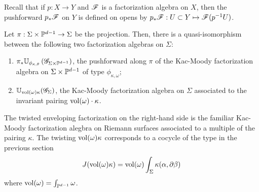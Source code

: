 Recall that if $p : X \to Y$ and $\mathscr F$ is a factorization algebra on $X$, then the pushforward $p_* \mathscr F$ on $Y$ is defined on opens by $p_* \mathscr F : U \subset Y \mapsto \mathscr F(p^{-1} U)$. 

\begin{prop}
Let $\pi : \Sigma \times \mathbb P^{d-1} \to \Sigma$ be the projection. 
Then, there is a quasi-isomorphism between the following two factorization algebras on $\Sigma$:
\begin{enumerate}
\item $\pi_* \mathbb U_{\phi_{\kappa, \theta}} \left(\mathscr G_{\Sigma \times \mathbb P^{d-1}}\right)$, the pushforward along $\pi$ of the Kac-Moody factorization algebra on $\Sigma \times \mathbb P^{d-1}$ of type $\phi_{\kappa,\omega}$;
\item $\mathbb U_{{\rm vol}(\omega) \kappa} (\mathscr G_\Sigma)$, the Kac-Moody factorization algebra on $\Sigma$ associated to the invariant pairing ${\rm vol}(\omega) \cdot \kappa$. 
\end{enumerate}
\end{prop}

The twisted enveloping factorization on the right-hand side is the familiar Kac-Moody factorization alegbra on Riemann surfaces associated to a multiple of the pairing $\kappa$.
The twisting ${\rm vol}(\omega) \kappa$ corresponds to a cocycle of the type in the previous section 
\[
J({\rm vol}(\omega) \kappa) = {\rm vol}(\omega) \int_\Sigma \kappa(\alpha, \partial \beta)
\]
where ${\rm vol}(\omega) = \int_{\mathbb P^{d-1}} \omega$. 

